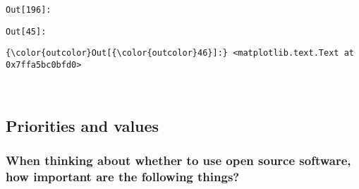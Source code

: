 \documentclass[11pt]{article}
\begin{document}
\texttt{\color{outcolor}Out[{\color{outcolor}196}]:}
    

    

\texttt{\color{outcolor}Out[{\color{outcolor}45}]:}
    

    


            \begin{Verbatim}[commandchars=\\\{\}]
{\color{outcolor}Out[{\color{outcolor}46}]:} <matplotlib.text.Text at 0x7ffa5bc0bfd0>
\end{Verbatim}
        
    \begin{center}
    \end{center}
    { \hspace*{\fill} \\}
    
    \subsection{Priorities and values}\label{priorities-and-values}

    \subsubsection{When thinking about whether to use open source software,
how important are the following
things?}\label{when-thinking-about-whether-to-use-open-source-software-how-important-are-the-following-things}
\end{document}
